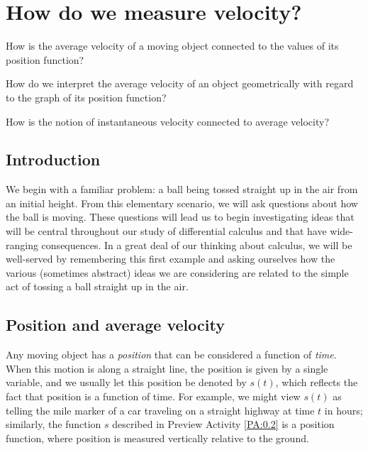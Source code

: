 \section{How do we measure velocity?} \label{S:0.2.Velocity}

\begin{goals}
\item How is the average velocity of a moving object connected to the values of its position function?
\item How do we interpret the average velocity of an object geometrically with regard to the graph of its position function?
\item How is the notion of instantaneous velocity connected to average velocity?
\end{goals}


\subsection*{Introduction}

We begin with a familiar problem:  a ball being tossed straight up in the air from an initial height.  From this elementary scenario, we will ask questions about how the ball is moving.  These questions will lead us to begin investigating ideas that will be central throughout our study of differential calculus and that have wide-ranging consequences.  In a great deal of our thinking about calculus, we will be well-served by remembering this first example and asking ourselves how the various (sometimes abstract) ideas we are considering are related to the simple act of tossing a ball straight up in the air.  


\subsection*{Position and average velocity}

Any moving object has a \emph{position} that can be considered a function of \emph{time}.  When this motion is along a straight line, the position is given by a single variable, and we usually let this position be denoted by $s(t)$, which reflects the fact that position is a function of time.  For example, we might view $s(t)$ as telling the mile marker of a car traveling on a straight highway at time $t$ in hours; similarly, the function $s$ described in Preview Activity \ref{PA:0.2} is a position function, where position is measured vertically relative to the ground.

